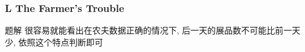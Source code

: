 \renewcommand{\problemname}{L The Farmer's Trouble}


\begin{frame}\frametitle{\problemname}
	
	\begin{block}{题解}
		很容易就能看出在农夫数据正确的情况下, 后一天的展品数不可能比前一天少, 依照这个特点判断即可
	\end{block}
\end{frame}